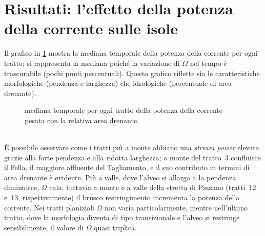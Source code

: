 \section{Risultati: l'effetto della potenza della corrente sulle isole}
Il grafico in \cref{graph:omega-perc-50} mostra la mediana temporale della potenza della corrente per ogni tratto; si rappresenta la mediana poiché la variazione di $\Omega$ nel tempo è trascurabile (pochi punti percentuali).
Questo grafico riflette sia le caratteristiche morfologiche (pendenza e larghezza) che idrologiche (percentuale di area drenante).
%
\begin{figure}
	\centering
	
	\caption[potenza della corrente in ogni tratto]{mediana temporale per ogni tratto della potenza della corrente pesata con la relativa area drenante.}
	\label{graph:omega-perc-50}
\end{figure}
%
\\
È possibile osservare come i tratti più a monte abbiano una \emph{stream power} elevata grazie alla forte pendenza e alla ridotta larghezza; a monte del tratto~3 confluisce il Fella, il maggiore affluente del Tagliamento, e il suo contributo in termini di area drenante è evidente.
Più a valle, dove l'alveo si allarga a la pendenza diminuisce, $\Omega$ cala; tuttavia a monte e a valle della stretta di Pinzano (tratti~12 e~13, rispettivamente) il brusco restringimento incrementa la potenza della corrente.
Nei tratti planiziali $\Omega$ non varia particolarmente, mentre nell'ultimo tratto, dove la morfologia diventa di tipo transizionale e l'alveo si restringe sensibilmente, il valore di $\Omega$ quasi triplica.

